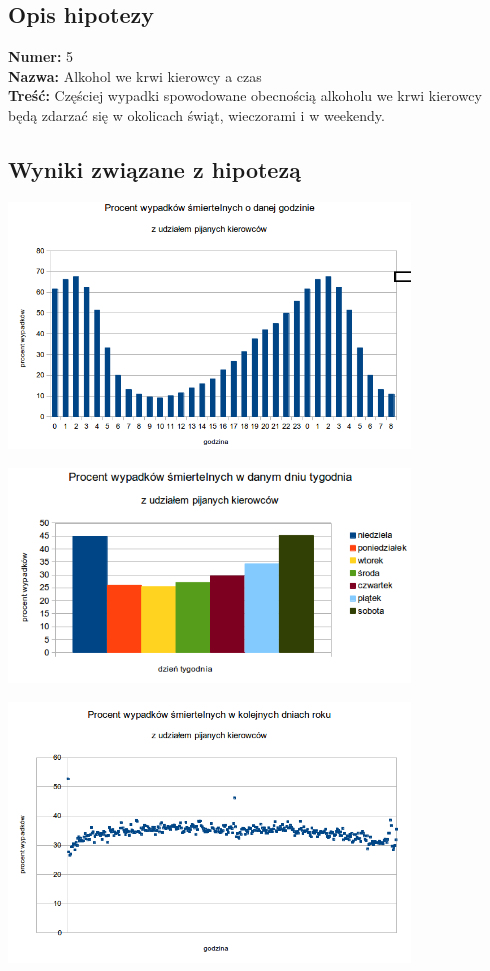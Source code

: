 \subsection{Opis hipotezy}\label{opis-hipotezy}

\textbf{Numer:} 5\\\textbf{Nazwa:} Alkohol we krwi kierowcy a
czas\\\textbf{Treść:} Częściej wypadki spowodowane obecnością alkoholu
we krwi kierowcy będą zdarzać się w okolicach świąt, wieczorami i w
weekendy.

\subsection{Wyniki związane z
hipotezą}\label{wyniki-zwiazane-z-hipoteza}

\centerline{\includegraphics[width=0.8\textwidth]{images/hipotheses/drunk_drivers/hour.png}}

\centerline{\includegraphics[width=0.8\textwidth]{images/hipotheses/drunk_drivers/day_of_week.png}}

\centerline{\includegraphics[width=0.8\textwidth]{images/hipotheses/drunk_drivers/day_of_year.png}}

